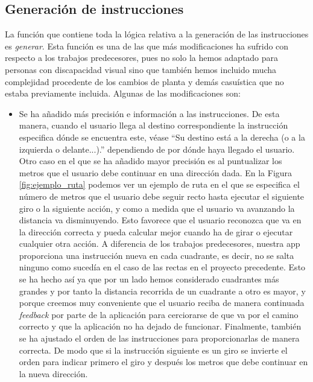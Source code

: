 \subsection{Generación de instrucciones}
\label{sub:genInstruc}

La función que contiene toda la lógica relativa a la generación de las instrucciones es \textit{generar}. Esta función es una de las que más modificaciones ha sufrido con respecto a los trabajos predecesores, pues no solo la hemos adaptado para personas con discapacidad visual sino que también hemos incluido mucha complejidad procedente de los cambios de planta y demás casuística que no estaba previamente incluida. Algunas de las modificaciones son: 

\begin{itemize}
	\item Se ha añadido más precisión e información a las instrucciones. De esta manera, cuando el usuario llega al destino correspondiente la instrucción especifica dónde se encuentra este, véase ``Su destino está a la derecha (o a la izquierda o delante...).'' dependiendo de por dónde haya llegado el usuario. Otro caso en el que se ha añadido mayor precisión es al puntualizar los metros que el usuario debe continuar en una dirección dada. En la Figura \ref{fig:ejemplo_ruta} podemos ver un ejemplo de ruta en el que se especifica el número de metros que el usuario debe seguir recto hasta ejecutar el siguiente giro o la siguiente acción, y como a medida que el usuario va avanzando la distancia va disminuyendo. Esto favorece que el usuario reconozca que va en la dirección correcta y pueda calcular mejor cuando ha de girar o ejecutar cualquier otra acción. A diferencia de los trabajos predecesores, nuestra app proporciona una instrucción nueva en cada cuadrante, es decir, no se salta ninguno como sucedía en el caso de las rectas en el proyecto precedente. Esto se ha hecho así ya que por un lado hemos considerado cuadrantes más grandes y por tanto la distancia recorrida de un cuadrante a otro es mayor, y porque creemos muy conveniente que el usuario reciba de manera continuada \textit{feedback} por parte de la aplicación para cerciorarse de que va por el camino correcto y que la aplicación no ha dejado de funcionar. Finalmente, también se ha ajustado el orden de las instrucciones para proporcionarlas de manera correcta. De modo que si la instrucción siguiente es un giro se invierte el orden para indicar primero el giro y después los metros que debe continuar en la nueva dirección.
	

\end{itemize}
